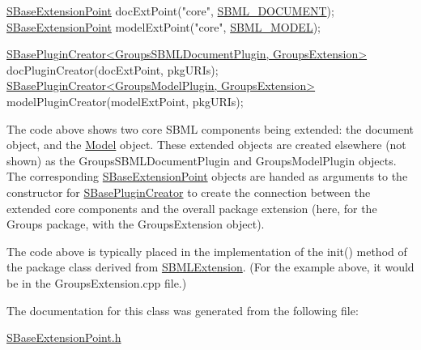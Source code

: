 \begin{DoxyCode}
\hyperlink{class_s_base_extension_point}{SBaseExtensionPoint} docExtPoint(\textcolor{stringliteral}{"core"}, \hyperlink{_s_b_m_l_type_codes_8h_aa283dddfd7671179362b2f38e2938cfeabfe976c674a5a708c1373dfdfa3bfa63}{SBML\_DOCUMENT});
\hyperlink{class_s_base_extension_point}{SBaseExtensionPoint} modelExtPoint(\textcolor{stringliteral}{"core"}, \hyperlink{_s_b_m_l_type_codes_8h_aa283dddfd7671179362b2f38e2938cfea3c866be107d7858b6dd1e978ed103028}{SBML\_MODEL});

\hyperlink{class_s_base_plugin_creator}{SBasePluginCreator<GroupsSBMLDocumentPlugin, GroupsExtension>}
       docPluginCreator(docExtPoint, pkgURIs);
\hyperlink{class_s_base_plugin_creator}{SBasePluginCreator<GroupsModelPlugin, GroupsExtension>}
       modelPluginCreator(modelExtPoint, pkgURIs);
\end{DoxyCode}


The code above shows two core S\+B\+ML components being extended\+: the document object, and the \hyperlink{class_model}{Model} object. These extended objects are created elsewhere (not shown) as the {\ttfamily Groups\+S\+B\+M\+L\+Document\+Plugin} and {\ttfamily Groups\+Model\+Plugin} objects. The corresponding \hyperlink{class_s_base_extension_point}{S\+Base\+Extension\+Point} objects are handed as arguments to the constructor for \hyperlink{class_s_base_plugin_creator}{S\+Base\+Plugin\+Creator} to create the connection between the extended core components and the overall package extension (here, for the Groups package, with the {\ttfamily Groups\+Extension} object).

The code above is typically placed in the implementation of the {\ttfamily init()} method of the package class derived from \hyperlink{class_s_b_m_l_extension}{S\+B\+M\+L\+Extension}. (For the example above, it would be in the {\ttfamily Groups\+Extension.\+cpp} file.) 

The documentation for this class was generated from the following file\+:\begin{DoxyCompactItemize}
\item 
\hyperlink{_s_base_extension_point_8h}{S\+Base\+Extension\+Point.\+h}\end{DoxyCompactItemize}
